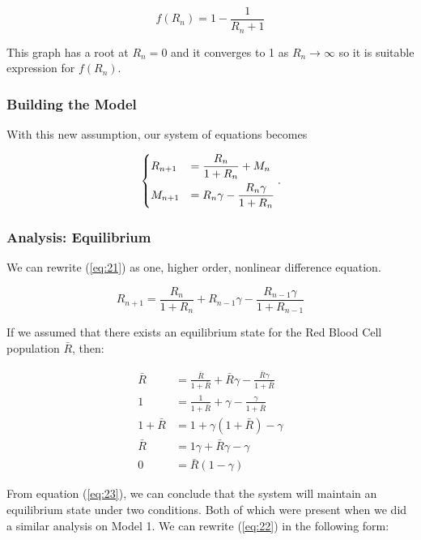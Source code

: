\[
f(R_n) = 1 - \frac{1}{R_n+1}
\]

This graph has a root at $R_n=0$ and it converges to 1 as $R_n\to\infty$ so it is suitable expression for $f(R_n)$.

\subsubsection{Building the Model}

With this new assumption, our system of equations becomes

\begin{equation}
    \begin{dcases}
        R_{n+1} &= \frac{R_n}{1 + R_n} + M_n\\
        M_{n+1} &= R_n\gamma-\frac{R_n\gamma}{1+R_n}
    \end{dcases}.
    \label{eq:21}
\end{equation}

\subsubsection{Analysis: Equilibrium}

We can rewrite (\ref{eq:21}) as one, higher order, nonlinear difference equation.

\begin{equation}
    R_{n+1} = \frac{R_n}{1 + R_n} + R_{n-1}\gamma-\frac{R_{n-1}\gamma}{1+R_{n-1}}
    \label{eq:22}
\end{equation}

If we assumed that there exists an equilibrium state for the Red Blood Cell population $\bar{R}$, then:

\begin{align}
     \bar{R} &= \frac{\bar{R}}{1 + \bar{R}} + \bar{R}\gamma - \frac{\bar{R}\gamma}{1+\bar{R}} \nonumber\\
     1 &= \frac{1}{1 + \bar{R}} + \gamma - \frac{\gamma}{1+\bar{R}} \nonumber\\
     1 + \bar{R} &= 1 + \gamma(1 + \bar{R}) - \gamma \nonumber\\
     \bar{R} &= 1\gamma + \bar{R}\gamma - \gamma \nonumber\\
     0 &= \bar{R}(1-\gamma) \label{eq:23}
\end{align}

From equation (\ref{eq:23}), we can conclude that the system will maintain an equilibrium state under two conditions. Both of which were present when we did a similar analysis on Model 1. We can rewrite (\ref{eq:22}) in the following form:


